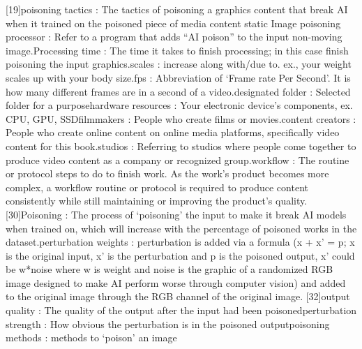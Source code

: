 [19]poisoning tactics : The tactics of poisoning a graphics content that break AI when it trained on the poisoned piece of media content \newline
[20]static Image poisoning processor : Refer to a program that adds “AI poison” to the input non-moving image.\newline
[21]Processing time : The time it takes to finish processing; in this case finish poisoning the input graphics.\newline
[22]scales : increase along with/due to. ex., your weight scales up with your body size.\newline
[23]fps : Abbreviation of ‘Frame rate Per Second’. It is how many different frames are in a second of a video.\newline
[24]designated folder : Selected folder for a purpose\newline
[25]hardware resources : Your electronic device’s components, ex. CPU, GPU, SSD\newline
[26]filmmakers : People who create films or movies.\newline
[27]content creators : People who create online content on online media platforms, specifically video content for this book.\newline
[28]studios : Referring to studios where people come together to produce video content as a company or recognized group.\newline
[29]workflow : The routine or protocol steps to do to finish work. As the work’s product becomes more complex, a workflow routine or protocol is required to produce content consistently while still maintaining or improving the product’s quality.
[30]Poisoning : The process of ‘poisoning’ the input to make it break AI models when trained on, which will increase with the percentage of poisoned works in the dataset.\newline
[31]perturbation weights : perturbation is added via a formula (x + x’ = p; x is the original input, x’ is the perturbation and p is the poisoned output, x’ could be w*noise where w is weight and noise is the graphic of a randomized RGB image designed to make AI perform worse through computer vision) and added to the original image through the RGB channel of the original image.
[32]output quality : The quality of the output after the input had been poisoned\newline
[33]perturbation strength : How obvious the perturbation is in the poisoned output\newline
[34]poisoning methods : methods to ‘poison’ an image\newline
